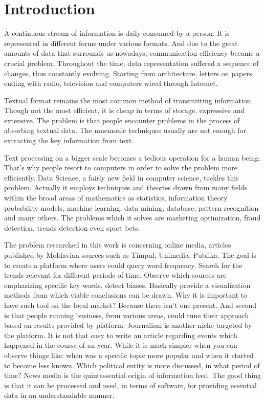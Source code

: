 \section*{Introduction}
A continuous stream of information is daily consumed by a person. It is represented in different forms under various formats. And due to the great amounts of data that surrounds us nowadays, communication efficiency became a crucial problem. Throughout the time, data representation suffered a sequence of changes, thus constantly evolving. Starting from architecture, letters on papers ending with radio, television and computers wired through Internet.

Textual format remains the most common method of transmitting information. Though not the most efficient, it is cheap in terms of storage, expressive and extensive. The problem is that people encounter problems in the process of absorbing textual data. The mnemonic techniques usually are not enough for extracting the key information from text.

Text processing on a bigger scale becomes a tedious operation for a human being. That's why people resort to computers in order to solve the problem more efficiently. Data Science, a fairly new field in computer science, tackles this problem. Actually it employs techniques and theories drawn from many fields within the broad areas of mathematics as statistics, information theory probability models, machine learning, data mining, database, pattern recognition and many others. The problems which it solves are marketing optimization, fraud detection, trends detection even sport bets.

The problem researched in this work is concerning online media, articles published by Moldavian sources such as Timpul, Unimedia, Publika. The goal is to create a platform where users could query word frequency. Search for the trends relevant for different periods of time. Observe which sources are emphasizing specific key words, detect biases. Basically provide a visualization methods from which viable conclusions can be drawn. Why it is important to have such tool on the local market? Because there isn't one present. And second is that people running business, from various areas, could tune their approach based on results provided by platform. Journalism is another niche targeted by the platform. It is not that easy to write an article regarding events which happened in the course of an year. While it is much simpler when you can observe things like: when was a specific topic more popular and when it started to become less known. Which political entity is more discussed, in what period of time? News media is the quintessential origin of information feed. The good thing is that it can be processed and used, in terms of software, for providing essential data in an understandable manner.

